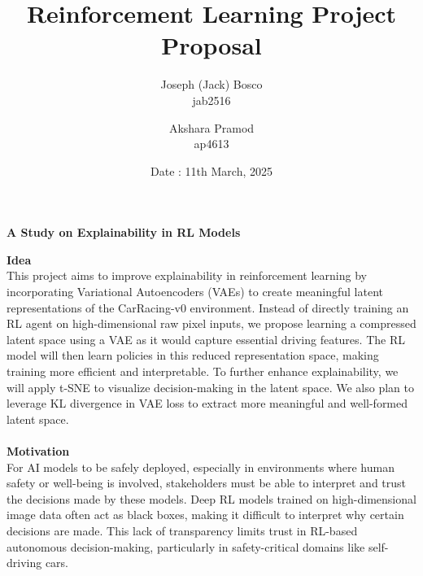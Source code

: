 \documentclass[12pt]{article}
\begin{document}
\title{\textbf{Reinforcement Learning Project Proposal}}

\author{Joseph (Jack) Bosco \\ jab2516  \and Akshara Pramod \\ ap4613}
\date{Date : 11th March, 2025}

\maketitle 

\begin{center}
    {\large \textbf{A Study on Explainability in RL Models}}
\end{center}

\noindent \textbf{Idea}\\
This project aims to improve explainability in reinforcement learning by incorporating Variational Autoencoders (VAEs) to create meaningful latent representations of the CarRacing-v0 environment. Instead of directly training an RL agent on high-dimensional raw pixel inputs, we propose learning a compressed latent space using a VAE as it would capture essential driving features. The RL model will then learn policies in this reduced representation space, making training more efficient and interpretable. To further enhance explainability, we will apply t-SNE to visualize decision-making in the latent space. We also plan to leverage KL divergence in VAE loss to extract more meaningful and well-formed latent space.\\
\\
\noindent \textbf{Motivation} \\
For AI models to be safely deployed, especially in environments where human safety or well-being is involved, stakeholders must be able to interpret and trust the decisions made by these models. Deep RL models trained on high-dimensional image data often act as black boxes, making it difficult to interpret why certain decisions are made. This lack of transparency limits trust in RL-based autonomous decision-making, particularly in safety-critical domains like self-driving cars.  
\\
\end{document}
